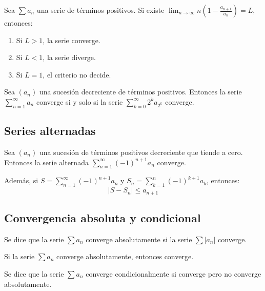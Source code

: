\begin{teorema}
    Sea $\sum a_n$ una serie de términos positivos. Si existe $\lim_{n \to \infty} n\left(1 - \frac{a_{n+1}}{a_n}\right) = L$, entonces:
    \begin{enumerate}
        \item Si $L > 1$, la serie converge.
        \item Si $L < 1$, la serie diverge.
        \item Si $L = 1$, el criterio no decide.
    \end{enumerate}
\end{teorema}

\begin{teorema}
    Sea $(a_n)$ una sucesión decreciente de términos positivos. Entonces la serie $\sum_{n=1}^\infty a_n$ converge si y solo si la serie $\sum_{k=0}^\infty 2^k a_{2^k}$ converge.
\end{teorema}

\subsection{Series alternadas}

\begin{teorema}
    Sea $(a_n)$ una sucesión de términos positivos decreciente que tiende a cero. Entonces la serie alternada $\sum_{n=1}^\infty (-1)^{n+1} a_n$ converge.
    
    Además, si $S = \sum_{n=1}^\infty (-1)^{n+1} a_n$ y $S_n = \sum_{k=1}^n (-1)^{k+1} a_k$, entonces:
    \[
    |S - S_n| \leq a_{n+1}
    \]
\end{teorema}

\subsection{Convergencia absoluta y condicional}

\begin{definición}
    Se dice que la serie $\sum a_n$ converge absolutamente si la serie $\sum |a_n|$ converge.
\end{definición}

\begin{teorema}
    Si la serie $\sum a_n$ converge absolutamente, entonces converge.
\end{teorema}

\begin{definición}
    Se dice que la serie $\sum a_n$ converge condicionalmente si converge pero no converge absolutamente.
\end{definición}

